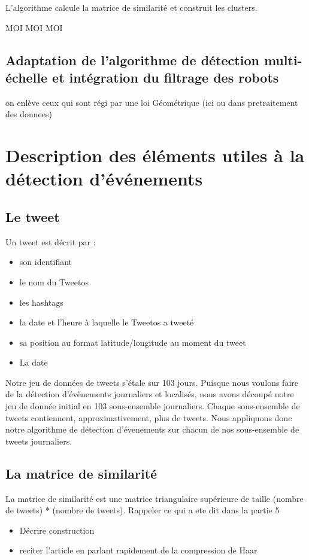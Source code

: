 \documentclass[12pt]{article}
\begin{document}
L'algorithme calcule la matrice de similarit\'e et construit les clusters.

MOI
\newline 
MOI 
\newline
MOI

\subsection{Adaptation de l'algorithme de d\'etection multi-\'echelle et int\'egration du filtrage des robots}

on enl\`eve ceux qui sont r\'egi par une loi G\'eom\'etrique (ici ou dans pretraitement des donnees)

\newpage

\section{Description des \'el\'ements utiles \`a la d\'etection d'\'ev\'enements}
\subsection{Le tweet}
Un tweet est d\'ecrit par : 

\begin{itemize}
\item son identifiant
\item le nom du Tweetos
\item les hashtags
\item la date et l'heure \`a laquelle le Tweetos a tweet\'e
\item sa position au format latitude/longitude au moment du tweet
\item La date
\end{itemize}

Notre jeu de donn\'ees de tweets s'\'etale sur 103 jours. Puisque nous voulons faire de la d\'etection d'\'ev\`enements journaliers et localis\'es, nous avons d\'ecoup\'e notre jeu de donn\'ee initial en 103 sous-ensemble journaliers. Chaque sous-ensemble de tweets contiennent, approximativement, plus de  tweets.
\newline
Nous appliquons donc notre algorithme de d\'etection d'\'evenements sur chacun de nos sous-ensemble de tweets journaliers.

\subsection{La matrice de similarit\'e}
La matrice de similarit\'e est une matrice triangulaire sup\'erieure de taille (nombre de
tweets) * (nombre de tweets).
\newline
Rappeler ce qui a ete dit dans la partie 5
\begin{itemize}
	\item D\'ecrire construction
	\item reciter l'article en parlant rapidement de la compression de Haar
\end{itemize}
\end{document}

